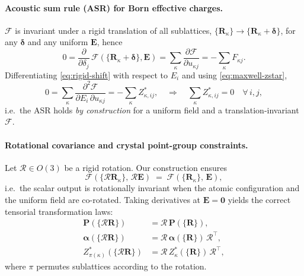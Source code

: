 \documentclass[aps,physrev,graphicx,amsmath,amssymb,
               reprint,superscriptaddress]{revtex4-2}
\begin{document}
\paragraph*{Acoustic sum rule (ASR) for Born effective charges.}
$\mathcal F$ is invariant under a rigid translation of all sublattices,
$\{\mathbf R_\kappa\}\!\to\!\{\mathbf R_\kappa+\boldsymbol\delta\}$, for any $\boldsymbol\delta$ and any uniform $\mathbf E$,
hence
\begin{equation}
0 = \frac{\partial}{\partial \delta_j}\,\mathcal F(\{\mathbf R_\kappa+\boldsymbol\delta\},\mathbf E)
= \sum_\kappa \frac{\partial \mathcal F}{\partial u_{\kappa j}}
= -\sum_\kappa F_{\kappa j}.
\label{eq:rigid-shift}
\end{equation}
Differentiating \eqref{eq:rigid-shift} with respect to $E_i$ and using \eqref{eq:maxwell-zstar},
\begin{equation}
0 = \sum_\kappa \frac{\partial^2 \mathcal F}{\partial E_i\,\partial u_{\kappa j}}
= - \sum_\kappa Z^*_{\kappa,ij},
\quad \Rightarrow \quad
\sum_\kappa Z^*_{\kappa,ij}=0 \quad \forall\,i,j,
\label{eq:asr-derivation}
\end{equation}
i.e.\ the ASR holds \emph{by construction} for a uniform field and a translation-invariant $\mathcal F$.
\\

\paragraph*{Rotational covariance and crystal point-group constraints.}
Let $\mathcal R\!\in\!O(3)$ be a rigid rotation. Our construction ensures
\begin{equation}
\mathcal F(\{\mathcal R\mathbf R_\kappa\},\,\mathcal R\mathbf E) \;=\; \mathcal F(\{\mathbf R_\kappa\},\,\mathbf E),
\label{eq:rot-inv}
\end{equation}
i.e.\ the scalar output is rotationally invariant when the atomic configuration and the uniform field are co-rotated.
Taking derivatives at $\mathbf E\!=\!\mathbf 0$ yields the correct tensorial transformation laws:
\begin{align}
\mathbf P(\{\mathcal R\mathbf R\}) &= \mathcal R\,\mathbf P(\{\mathbf R\}),\\
\boldsymbol\alpha(\{\mathcal R\mathbf R\})
&= \mathcal R\,\boldsymbol\alpha(\{\mathbf R\})\,\mathcal R^\top, \label{eq:alpha-cov}\\
Z^*_{\pi(\kappa)}(\{\mathcal R\mathbf R\})
&= \mathcal R\,Z^*_{\kappa}(\{\mathbf R\})\,\mathcal R^\top,
\label{eq:zstar-cov}
\end{align}
where $\pi$ permutes sublattices according to the rotation.
\\
\end{document}
